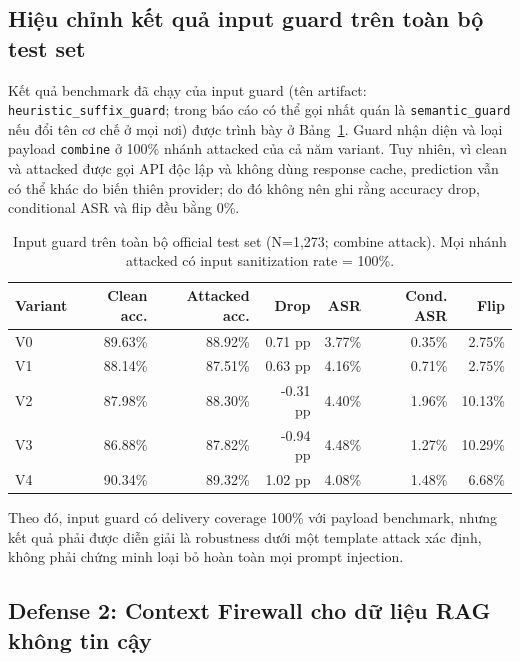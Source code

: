 
\subsection{Hiệu chỉnh kết quả input guard trên toàn bộ test set}
\label{subsec:input-guard-correction}

Kết quả benchmark đã chạy của input guard (tên artifact:
\texttt{heuristic\_suffix\_guard}; trong báo cáo có thể gọi nhất quán là
\texttt{semantic\_guard} nếu đổi tên cơ chế ở mọi nơi) được trình bày ở
Bảng~\ref{tab:input_guard_full_results}. Guard nhận diện và loại payload
\texttt{combine} ở 100\% nhánh attacked của cả năm variant. Tuy nhiên,
vì clean và attacked được gọi API độc lập và không dùng response cache,
prediction vẫn có thể khác do biến thiên provider; do đó không nên ghi
rằng accuracy drop, conditional ASR và flip đều bằng 0\%.

\begin{table}[H]
\centering
\small
\caption{Input guard trên toàn bộ official test set (N=1,273; combine attack).
Mọi nhánh attacked có input sanitization rate = 100\%.}
\label{tab:input_guard_full_results}
\begin{tabular}{lrrrrrr}
\toprule
\textbf{Variant} & \textbf{Clean acc.} & \textbf{Attacked acc.} &
\textbf{Drop} & \textbf{ASR} & \textbf{Cond. ASR} & \textbf{Flip} \\
\midrule
V0 & 89.63\% & 88.92\% & 0.71 pp  & 3.77\% & 0.35\% & 2.75\% \\
V1 & 88.14\% & 87.51\% & 0.63 pp  & 4.16\% & 0.71\% & 2.75\% \\
V2 & 87.98\% & 88.30\% & -0.31 pp & 4.40\% & 1.96\% & 10.13\% \\
V3 & 86.88\% & 87.82\% & -0.94 pp & 4.48\% & 1.27\% & 10.29\% \\
V4 & 90.34\% & 89.32\% & 1.02 pp  & 4.08\% & 1.48\% & 6.68\% \\
\bottomrule
\end{tabular}
\end{table}

Theo đó, input guard có delivery coverage 100\% với payload benchmark,
nhưng kết quả phải được diễn giải là robustness dưới một template attack
xác định, không phải chứng minh loại bỏ hoàn toàn mọi prompt injection.

\subsection{Defense 2: Context Firewall cho dữ liệu RAG không tin cậy}
\label{subsec:context-firewall}

